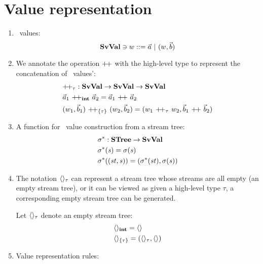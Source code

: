 \section{Value representation}
\begin{enumerate}[(1)]
	\item \fmsvcode \  values: $$\SvVal \ni \v ::= \a \ | \ (\v,\b) $$
	
	\item We annotate the operation ${\++}$ with the high-level type to represent the concatenation of \fmsvcode \  values': 
	\begin{align*}
	&{\++}_{\tau}: \SvVal \->  \SvVal \-> \SvVal \\
	& \a_1 \ {\++}_{\int}  \ \a_2 = \a_1 \ {\++} \ \a_2 \\
	&{(w_1,\b_1)} \ {\++}_{\{\tau\}} \  {(w_2,\b_2)} = ({w_1} \ {\++}_{\tau} \ {w_2}, {\b_1} \ {\++} \ {\b_2})
	\end{align*}
	
	\item A function for \fmsvcode \  value construction from a stream tree:
	\begin{align*}
	&\sgm^* : \STree \-> \SvVal \\
	&\sgm^*(\s) = \sgm(\s) \\
	&\sgm^*((\st,\s)) = (\sgm^*(\st), \sgm(\s)) 
	\end{align*}

\item The notation $\langle \rangle_{\tau}$ can represent a stream tree whose streams are all empty (an empty stream  tree), or it can be viewed as given a high-level type $\tau$, a corresponding empty stream tree can be generated.
\begin{nota}
	Let $\langle \rangle_{\tau}$ denote an empty stream tree: 
	\begin{align*}
	&\langle \rangle_{\mathbf{int}} = \langle \rangle \\
	&\langle \rangle_{\{\tau\}} = (\langle \rangle_{\tau},\langle \rangle) 
	\end{align*}
\end{nota}


\item Value representation rules: \\
	
		
		\PT{ \Axiom{\ValRep{\{\}}{\tseq{\tau}}{(\emptyvtau{\tau},\oT)}}
	}\\

		\\
		

\end{enumerate}
